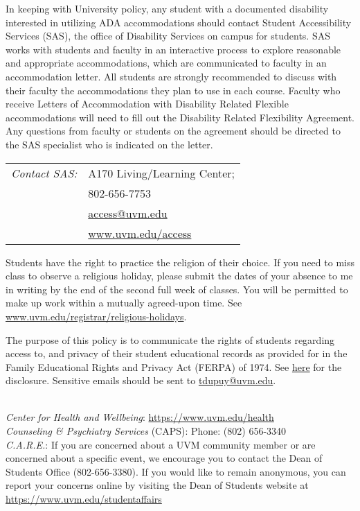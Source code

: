 \documentclass[11pt, letterpaper]{article}
\theoremstyle{definition}
\theoremstyle{remark}
\begin{document}
 In keeping with University policy, any student with a documented disability interested in utilizing ADA accommodations should contact Student Accessibility Services (SAS), the office of Disability Services on campus for students. SAS works with students and faculty in an interactive process to explore reasonable and appropriate accommodations, which are communicated to faculty in an accommodation letter. All students are strongly recommended to discuss with their faculty the accommodations they plan to use in each course. Faculty who receive Letters of Accommodation with Disability Related Flexible accommodations will need to fill out the Disability Related Flexibility Agreement. Any questions from faculty or students on the agreement should be directed to the SAS specialist who is indicated on the letter. 
\begin{tabular}{ll}
{\em Contact SAS:} &A170 Living/Learning Center; \\
&802-656-7753 \\ 
&\href{mailto:access@uvm.edu}{access@uvm.edu} \\
&\href{https://www.uvm.edu/access}{www.uvm.edu/access}
\end{tabular}

\vspace{1em}

 Students have the right to practice the religion of their choice. If you need to miss class to observe a religious holiday, please submit the dates of your absence to me in writing by the end of the second full week of classes. You will be permitted to make up work within a mutually agreed-upon time. See \href{https://www.uvm.edu/registrar/religious-holidays}{www.uvm.edu/registrar/religious-holidays}.
\vspace{1em}

 The purpose of this policy is to communicate the rights of students regarding access to, and privacy of their student educational records as provided for in the Family Educational Rights and Privacy Act (FERPA) of 1974. See \href{http://catalogue.uvm.edu/undergraduate/academicinfo/ferparightsdisclosure/}{here} for the disclosure.
Sensitive emails should be sent to \href{mailto:tdupuy@uvm.edu}{tdupuy@uvm.edu}.
\vspace{1em}

 \\
{\em Center for Health and Wellbeing}:
\url{https://www.uvm.edu/health} \\
{\em Counseling \& Psychiatry Services} (CAPS):
Phone: (802) 656-3340 \\
{\em C.A.R.E.}: If you are concerned about a UVM community member or are concerned about a specific event, we encourage you to contact the Dean of Students Office (802-656-3380).  If you would like to remain anonymous, you can report your concerns online by visiting the Dean of Students website at \url{https://www.uvm.edu/studentaffairs}
\vspace{1em}



 
\end{document}
